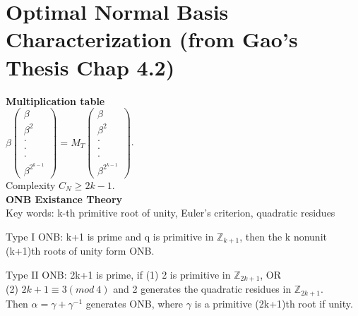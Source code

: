 \documentclass[12pt]{article}
\begin{document}
\section{Optimal Normal Basis Characterization (from Gao's Thesis Chap 4.2)}
\textbf{Multiplication table}\\
$\beta \left( \begin{array} {lcr}
 \beta \\ 
\beta^2 \\ 
\cdot \\ 
\cdot \\ 
\cdot \\ 
\beta^{2^{k-1}} 
\end{array} \right) = M_T \left( \begin{array} {lcr}
 \beta \\ 
\beta^2 \\ 
\cdot \\ 
\cdot \\ 
\cdot \\ 
\beta^{2^{k-1}} 
\end{array} \right)$. \\

Complexity $C_N \geq 2k - 1$.\\

\textbf{ONB Existance Theory}\\
Key words: k-th primitive root of unity, Euler's criterion, quadratic residues\\
\hspace{8mm}\par
Type I ONB: k+1 is prime and q is primitive in $\mathbb{Z}_{k+1}$, then the k nonunit (k+1)th roots of unity form ONB.\\
\hspace{8mm}\par
Type II ONB: 2k+1 is prime, if (1) 2 is primitive in $\mathbb{Z}_{2k+1}$, OR \\
(2) $2k + 1 \equiv 3(mod \  4)$ and 2 generates the quadratic residues in $\mathbb{Z}_{2k+1}$.\\
Then $\alpha = \gamma + \gamma^{-1}$ generates ONB, where $\gamma$ is a primitive (2k+1)th root if unity.\\
\end{document}
